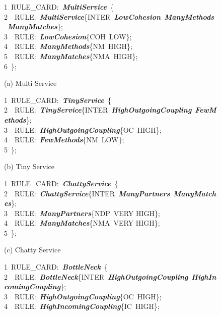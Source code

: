 \begin{figure}
\begin{small}
\scriptsize
1~RULE\_CARD:~\emph{\textbf{MultiService}}~\{\\
2~~RULE:~\emph{\textbf{MultiService}}\{INTER~\emph{\textbf{LowCohesion}}~\emph{\textbf{ManyMethods}}~\emph{\textbf{ManyMatches}}\};\\
3~~RULE:~\emph{\textbf{LowCohesion}}\{COH~LOW\};\\
4~~RULE:~\emph{\textbf{ManyMethods}}\{NM~HIGH\};\\
5~~RULE:~\emph{\textbf{ManyMatches}}\{NMA~HIGH\};\\
6~\};
\vspace{-0.2cm}
\begin{center}
(a) Multi Service
\end{center}
\vspace{-0.2cm}
1~RULE\_CARD:~\emph{\textbf{TinyService}}~\{\\
2~~RULE:~\emph{\textbf{TinyService}}\{INTER~\emph{\textbf{HighOutgoingCoupling}}~\emph{\textbf{FewMethods}}\};\\
3~~RULE:~\emph{\textbf{HighOutgoingCoupling}}\{OC~HIGH\};\\
4~~RULE:~\emph{\textbf{FewMethods}}\{NM~LOW\};\\
5~\};
\vspace{-0.2cm}
\begin{center}
(b) Tiny Service
\end{center}
\vspace{-0.2cm}
1~RULE\_CARD:~\emph{\textbf{ChattyService}}~\{\\
2~~RULE:~\emph{\textbf{ChattyService}}\{INTER~\emph{\textbf{ManyPartners}}~\emph{\textbf{ManyMatches}}\};\\
3~~RULE:~\emph{\textbf{ManyPartners}}\{NDP~VERY HIGH\};\\
4~~RULE:~\emph{\textbf{ManyMatches}}\{NMA~VERY HIGH\};\\
5~\};
\vspace{-0.2cm}
\begin{center}
(c) Chatty Service
\end{center}
\vspace{-0.2cm}
1~RULE\_CARD:~\emph{\textbf{BottleNeck}}~\{\\
2~~RULE:~\emph{\textbf{BottleNeck}}\{INTER~\emph{\textbf{HighOutgoingCoupling}}~\emph{\textbf{HighIncomingCoupling}}\};\\
3~~RULE:~\emph{\textbf{HighOutgoingCoupling}}\{OC~HIGH\};\\
4~~RULE:~\emph{\textbf{HighIncomingCoupling}}\{IC~HIGH\};\\

\end{small}
\end{figure}
